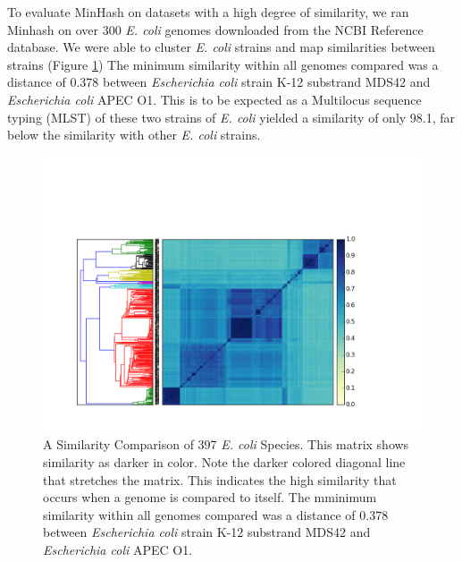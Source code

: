 \documentclass[12pt, letterpaper]{article}
\begin{document}
To evaluate MinHash on datasets with a high degree of similarity, we ran Minhash on over 300 \textit{E. coli} genomes downloaded from the NCBI Reference database. We were able to cluster \textit{E. coli} strains and map similarities between strains (Figure \ref{fig:All Ecoli}) The minimum similarity within all genomes compared was a distance of 0.378 between \textit{Escherichia coli} strain K-12 substrand MDS42 and \textit{Escherichia coli} APEC O1. This is to be expected as a Multilocus sequence typing (MLST) of these two strains of \textit{E. coli} yielded a similarity of only 98.1, far below the similarity with other \textit{E. coli} strains.\cite{E coli}

\FloatBarrier
\begin{figure}[h]
    \centering
    \includegraphics[width=1.0\textwidth]{All_E_coli}
    \caption{A Similarity Comparison of 397 \textit{E. coli} Species. This matrix shows similarity as darker in color. Note the darker colored diagonal line that stretches the matrix. This indicates the high similarity that occurs when a genome is compared to itself. The mminimum similarity within all genomes compared was a distance of 0.378 between \textit{Escherichia coli} strain K-12 substrand MDS42 and \textit{Escherichia coli} APEC O1.}
    \label{fig:All Ecoli}
\end{figure}
\FloatBarrier
\end{document}
